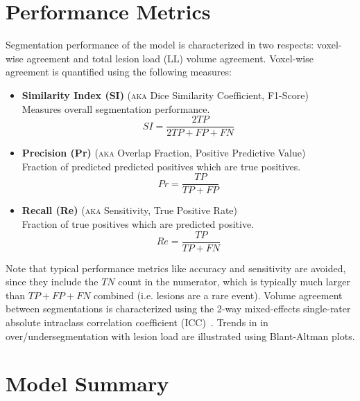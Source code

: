 \section{Performance Metrics}
\label{ss:metrics}
Segmentation performance of the model is characterized in two respects: voxel-wise agreement and total lesion load (LL) volume agreement. Voxel-wise agreement is quantified using the following measures:
\begin{itemize}
  \item \textbf{Similarity Index (SI)} (\textsc{aka} Dice Similarity Coefficient, F1-Score)\\Measures overall segmentation performance.
  \begin{equation}SI = \dfrac{2TP}{2TP + FP + FN}\end{equation}
  \item \textbf{Precision (Pr)} (\textsc{aka} Overlap Fraction, Positive Predictive Value)\\Fraction of predicted predicted positives which are true positives.
  \begin{equation}Pr = \dfrac{TP}{TP+FP}\end{equation}
  \item \textbf{Recall (Re)} (\textsc{aka} Sensitivity, True Positive Rate)\\Fraction of true positives which are predicted positive.
  \begin{equation}Re = \dfrac{TP}{TP+FN}\end{equation}
\end{itemize}
Note that typical performance metrics like accuracy and sensitivity are avoided, since they include the $TN$ count in the numerator, which is typically much larger than $TP + FP + FN$ combined (i.e. lesions are a rare event). Volume agreement between segmentations is characterized using the 2-way mixed-effects single-rater absolute intraclass correlation coefficient (ICC)\footnotemark\ \cite{Koo2016}. Trends in in over/undersegmentation with lesion load are illustrated using Blant-Altman plots.

\section{Model Summary}



